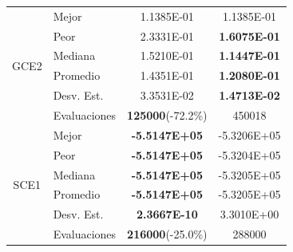 \begin{table}
\begin{tabular}{clcc}
		
		\multirow{6}{*}{GCE2} & Mejor        &1.1385E-01&1.1385E-01\\
		& Peor         &2.3331E-01&\textbf{1.6075E-01}\\
		& Mediana      &1.5210E-01&\textbf{1.1447E-01 }\\
		& Promedio     &1.4351E-01&\textbf{1.2080E-01  }\\
		& Desv. Est.   &3.3531E-02&\textbf{1.4713E-02 }\\
		& Evaluaciones &\textbf{125000}(-72.2\%)&450018 \\
		\hline
		\multirow{6}{*}{SCE1} & Mejor        &\textbf{ -5.5147E+05}&-5.3206E+05 \\
		& Peor         &\textbf{ -5.5147E+05}&-5.3204E+05\\
		& Mediana      &\textbf{ -5.5147E+05}&-5.3205E+05\\
		& Promedio     & \textbf{-5.5147E+05}&-5.3205E+05\\
		& Desv. Est.   &\textbf{2.3667E-10}&3.3010E+00\\
		& Evaluaciones &\textbf{216000}(-25.0\%)&288000 \\
		
		
		\hline
	\end{tabular}
\end{table}

